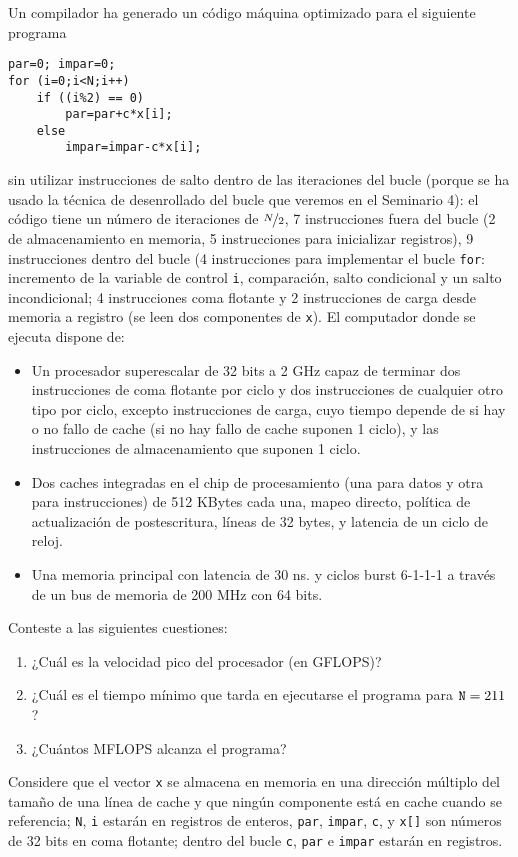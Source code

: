 \begin{ejercicio}
    Un compilador ha generado un código máquina optimizado para el siguiente programa
    \begin{verbatim}
par=0; impar=0;
for (i=0;i<N;i++)
    if ((i%2) == 0)
        par=par+c*x[i];
    else
        impar=impar-c*x[i];
    \end{verbatim}
    sin utilizar instrucciones de salto dentro de las iteraciones del bucle (porque se ha usado la técnica de
    desenrollado del bucle que veremos en el Seminario 4): el código tiene un número de iteraciones de $\nicefrac{N}{2}$, 7
    instrucciones fuera del bucle (2 de almacenamiento en memoria, 5 instrucciones para inicializar registros), 9
    instrucciones dentro del bucle (4 instrucciones para implementar el bucle \verb|for|: incremento de la variable de
    control \verb|i|, comparación, salto condicional y un salto incondicional; 4 instrucciones coma flotante y 2
    instrucciones de carga desde memoria a registro (se leen dos componentes de \verb|x|). El computador donde se
    ejecuta dispone de:
    \begin{itemize}
        \item Un procesador superescalar de 32 bits a 2 GHz capaz de terminar dos instrucciones de coma
        flotante por ciclo y dos instrucciones de cualquier otro tipo por ciclo, excepto instrucciones de carga,
        cuyo tiempo depende de si hay o no fallo de cache (si no hay fallo de cache suponen 1 ciclo), y las
        instrucciones de almacenamiento que suponen 1 ciclo.
        \item Dos caches integradas en el chip de procesamiento (una para datos y otra para instrucciones) de
        512 KBytes cada una, mapeo directo, política de actualización de postescritura, líneas de 32 bytes, y
        latencia de un ciclo de reloj.
        \item Una memoria principal con latencia de 30 ns. y ciclos burst 6-1-1-1 a través de un bus de memoria de
        200 MHz con 64 bits.
    \end{itemize}
    Conteste a las siguientes cuestiones:
    \begin{enumerate}
        \item ¿Cuál es la velocidad pico del procesador (en GFLOPS)?
        \item ¿Cuál es el tiempo mínimo que tarda en ejecutarse el programa para $\verb|N|=211$?
        \item ¿Cuántos MFLOPS alcanza el programa?
    \end{enumerate}

    \begin{observacion}
        Considere que el vector \verb|x| se almacena en memoria en una dirección múltiplo del tamaño de una
        línea de cache y que ningún componente está en cache cuando se referencia; \verb|N|, \verb|i| estarán en
        registros de enteros, \verb|par|, \verb|impar|, \verb|c|, y \verb|x[]| son números de 32 bits en coma
        flotante; dentro del bucle \verb|c|, \verb|par| e \verb|impar| estarán en registros.
    \end{observacion}
\end{ejercicio}


